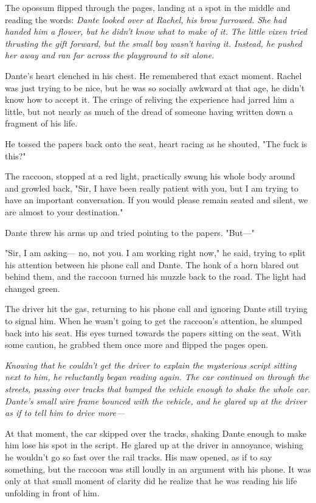The opossum flipped through the pages, landing at a spot in the middle and reading the words: \emph{Dante looked over at Rachel, his brow furrowed. She had handed him a flower, but he didn't know what to make of it. The little vixen tried thrusting the gift forward, but the small boy wasn't having it. Instead, he pushed her away and ran far across the playground to sit alone.}

Dante's heart clenched in his chest. He remembered that exact moment. Rachel was just trying to be nice, but he was so socially awkward at that age, he didn't know how to accept it. The cringe of reliving the experience had jarred him a little, but not nearly as much of the dread of someone having written down a fragment of his life.

He tossed the papers back onto the seat, heart racing as he shouted, "The fuck is this?"

The raccoon, stopped at a red light, practically swung his whole body around and growled back, "Sir, I have been really patient with you, but I am trying to have an important conversation. If you would please remain seated and silent, we are almost to your destination."

Dante threw his arms up and tried pointing to the papers. "But---"

"Sir, I am asking--- no, not you. I am working right now," he said, trying to split his attention between his phone call and Dante. The honk of a horn blared out behind them, and the raccoon turned his muzzle back to the road. The light had changed green.

The driver hit the gas, returning to his phone call and ignoring Dante still trying to signal him. When he wasn't going to get the raccoon's attention, he slumped back into his seat. His eyes turned towards the papers sitting on the seat. With some caution, he grabbed them once more and flipped the pages open.

\emph{Knowing that he couldn't get the driver to explain the mysterious script sitting next to him, he reluctantly began reading again. The car continued on through the streets, passing over tracks that bumped the vehicle enough to shake the whole car. Dante's small wire frame bounced with the vehicle, and he glared up at the driver as if to tell him to drive more---}

At that moment, the car skipped over the tracks, shaking Dante enough to make him lose his spot in the script. He glared up at the driver in annoyance, wishing he wouldn't go so fast over the rail tracks. His maw opened, as if to say something, but the raccoon was still loudly in an argument with his phone. It was only at that small moment of clarity did he realize that he was reading his life unfolding in front of him.

